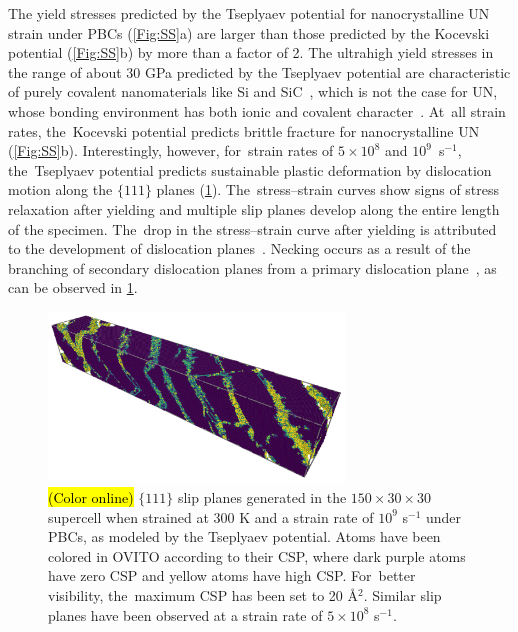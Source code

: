 \documentclass[applsci,article,accept,pdftex,moreauthors]{Definitions/mdpi}
\newcommand{\?}{\stackrel{?}{=}}
\begin{document}
The yield stresses predicted by the Tseplyaev potential for nanocrystalline UN strain under PBCs (\cref{Fig:SS}a) are larger than those %
predicted by the Kocevski potential (\cref{Fig:SS}b) by more than a factor of 2. The ultrahigh yield stresses in the range of about 30 GPa predicted by the Tseplyaev potential are characteristic of purely covalent nanomaterials like Si and SiC~\cite{Ivashchenko2007}, which is not the case for UN, whose bonding environment has both ionic and covalent character~\cite{Kuksin2016}. At~all strain rates, the~Kocevski potential predicts brittle fracture for nanocrystalline UN (\cref{Fig:SS}b). Interestingly, however, for~strain rates of $5 \times 10^{8}$ and \mbox{$10^{9}$ s$^{-1}$,} the~Tseplyaev potential predicts sustainable plastic deformation by dislocation motion along the $\{ 111 \}$ planes (\cref{Fig:Slip}). The~stress--strain curves show signs of stress relaxation after yielding and multiple slip planes develop along the entire length of the specimen. The~drop in the stress--strain curve after yielding is attributed to the development of dislocation planes~\cite{Pal2020}. Necking occurs as a result of the branching of secondary dislocation planes from a primary dislocation plane~\cite{Pal2020}, as can be observed in \cref{Fig:Slip}.

\begin{figure}[H]
    \includegraphics[width=0.70\textwidth]{SlipADP1e9.png}
    \caption{\hl{(Color online)} %
 $\{ 111 \}$ slip planes generated in the $150 \times 30 \times 30$ supercell when strained at 300 K and a strain rate of $10^{9}$ s$^{-1}$ under PBCs, as modeled by the Tseplyaev potential. Atoms have been colored in OVITO according to their CSP, where dark purple atoms have zero CSP and yellow atoms have high CSP. For~better visibility, the~maximum CSP has been set to 20 \AA$^2$. Similar slip planes have been observed at a strain rate of $5 \times 10^{8}$ s$^{-1}$.}
    \label{Fig:Slip}
\end{figure}
\end{document}
